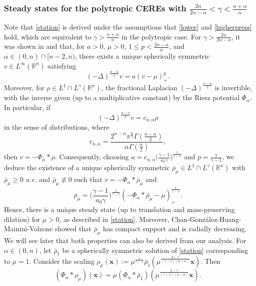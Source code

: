 \documentclass[reqno,11pt]{amsart}
\numberwithin{equation}{section}
\theoremstyle{definition}
\begin{document}
\subsubsection{Steady states for the polytropic CEREs with
$\frac{2n}{2n - \alpha} < \gamma < \frac{n + \alpha}{n}$}
Note that \eqref{station} is derived under the assumptions 
that \eqref{lower} and \eqref{higherpress} hold, which are  
equivalent to $\gamma > \frac{n+\alpha}{n}$ in the polytropic case.
For $\gamma > \frac{2n}{2n-\alpha}$, it was shown in \cite{Chan_2020} and \cite{Flucher_1998} 
that, for $a > 0$, $\mu > 0$, $1 \leq p < \frac{2n - \alpha}{\alpha}$, 
and $\alpha \in (0,n) \cap [n-2,n)$, there exists a unique spherically 
symmetric $v \in L^\infty(\mathbb{R}^n)$ satisfying
    \[
   (-\Delta)^\frac{n-\alpha}{2} v = a (v - \mu)_+^p.
    \]
Moreover, for $\rho \in L^1 \cap L^\gamma(\mathbb{R}^n)$, 
the fractional Laplacian $(-\Delta)^\frac{n-\alpha}{2}$ is invertible, 
with the inverse given (up to a multiplicative constant) by the Riesz potential $\Phi_\alpha$. 
In particular, if
    \[ (-\Delta)^\frac{n-\alpha}{2} v = c_{n,\alpha} \rho
    \]
in the sense of distributions, where
    \[c_{n,\alpha} = \frac{2^{n-\alpha} \pi^\frac{n}{2} \Gamma\left (\frac{n-\alpha}{2} \right )}{\alpha \Gamma\left (\frac{\alpha}{2} \right )},
    \]
then $v = -\Phi_\alpha * \rho$. 
Consequently, choosing $a = c_{n,\alpha} \Big ( \frac{\gamma - 1}{a_0 \gamma} \Big )^\frac{1}{\gamma - 1}$
and $p = \frac{1}{\gamma - 1}$, 
we deduce the existence of a unique spherically symmetric 
$\bar{\rho}_\mu \in L^1 \cap L^\gamma(\mathbb{R}^n)$ with $\bar{\rho}_\mu \geq 0$ {\it a.e.} and $\bar{\rho}_\mu \not \equiv 0$ such that $v = - \Phi_\alpha * \bar{\rho}_\mu$ and
    \[  \bar{\rho}_\mu = \Big ( \frac{\gamma - 1}{a_0 \gamma} \Big )^\frac{1}{\gamma - 1} (- \Phi_\alpha * \bar{\rho}_\mu - \mu)_+^\frac{1}{\gamma - 1}.
    \]
Hence, there is a unique steady state (up to translation and mass-preserving dilation) 
for $\mu >0$, as described 
in \eqref{station}. 
Moreover, Chan-Gonz\'alez-Huang-Mainini-Volzone showed that $\bar{\rho}_\mu$ has compact support 
and is radially decreasing. 
We will see later that both properties can also be derived from our analysis.
For $\alpha \in (0,n)$, let $\bar{\rho}_1$ be a spherically symmetric solution 
of \eqref{station} corresponding to $\mu = 1$.
Consider the scaling 
$\rho_\mu(\boldsymbol{x}) := 
\mu^\frac{1}{\gamma - 1}\bar{\rho}_1(\mu^\frac{2-\gamma}{(\gamma - 1)(n-\alpha)} \boldsymbol{x})$. 
Then 
    \[  (\Phi_\alpha * \rho_\mu)(\boldsymbol{x}) 
= \mu (\Phi_\alpha * \bar{\rho}_1)(\mu^\frac{2-\gamma}{(\gamma - 1)(n-\alpha)}\boldsymbol{x}).
    \]
\end{document}
